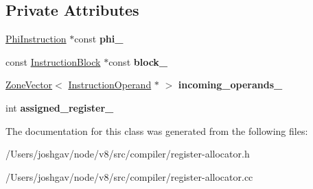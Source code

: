 \subsection*{Private Attributes}
\begin{DoxyCompactItemize}
\item 
\hyperlink{classv8_1_1internal_1_1compiler_1_1_phi_instruction}{Phi\+Instruction} $\ast$const {\bfseries phi\+\_\+}\hypertarget{classv8_1_1internal_1_1compiler_1_1_register_allocation_data_1_1_phi_map_value_a0ee6f0cb39c35dc5b76371b82ec7a9f7}{}\label{classv8_1_1internal_1_1compiler_1_1_register_allocation_data_1_1_phi_map_value_a0ee6f0cb39c35dc5b76371b82ec7a9f7}

\item 
const \hyperlink{classv8_1_1internal_1_1compiler_1_1_instruction_block}{Instruction\+Block} $\ast$const {\bfseries block\+\_\+}\hypertarget{classv8_1_1internal_1_1compiler_1_1_register_allocation_data_1_1_phi_map_value_aad792415e2c3ccfbc299738a646680bb}{}\label{classv8_1_1internal_1_1compiler_1_1_register_allocation_data_1_1_phi_map_value_aad792415e2c3ccfbc299738a646680bb}

\item 
\hyperlink{classv8_1_1internal_1_1_zone_vector}{Zone\+Vector}$<$ \hyperlink{classv8_1_1internal_1_1compiler_1_1_instruction_operand}{Instruction\+Operand} $\ast$ $>$ {\bfseries incoming\+\_\+operands\+\_\+}\hypertarget{classv8_1_1internal_1_1compiler_1_1_register_allocation_data_1_1_phi_map_value_a69ae0c888798d64f59c74e90620ad867}{}\label{classv8_1_1internal_1_1compiler_1_1_register_allocation_data_1_1_phi_map_value_a69ae0c888798d64f59c74e90620ad867}

\item 
int {\bfseries assigned\+\_\+register\+\_\+}\hypertarget{classv8_1_1internal_1_1compiler_1_1_register_allocation_data_1_1_phi_map_value_a31951c3d22569d74959f0f11bd35ac0b}{}\label{classv8_1_1internal_1_1compiler_1_1_register_allocation_data_1_1_phi_map_value_a31951c3d22569d74959f0f11bd35ac0b}

\end{DoxyCompactItemize}


The documentation for this class was generated from the following files\+:\begin{DoxyCompactItemize}
\item 
/\+Users/joshgav/node/v8/src/compiler/register-\/allocator.\+h\item 
/\+Users/joshgav/node/v8/src/compiler/register-\/allocator.\+cc\end{DoxyCompactItemize}
